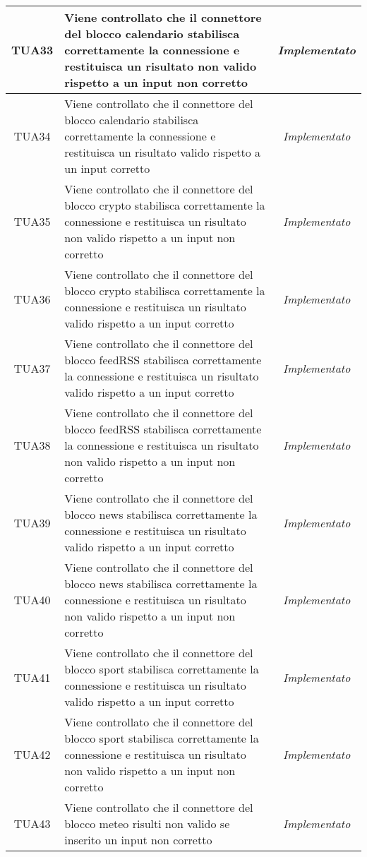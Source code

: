 \begin{longtable}{|c|m{12em}|c|}
TUA33 & Viene controllato che il connettore del blocco calendario stabilisca correttamente la connessione e restituisca un risultato non valido rispetto a un input non corretto& \textit{Implementato}\\ \hline
TUA34 & Viene controllato che il connettore del blocco calendario stabilisca correttamente la connessione e restituisca un risultato valido rispetto a un input corretto& \textit{Implementato}\\ \hline
TUA35 & Viene controllato che il connettore del blocco crypto stabilisca correttamente la connessione e restituisca un risultato non valido rispetto a un input non corretto& \textit{Implementato}\\ \hline
TUA36 & Viene controllato che il connettore del blocco crypto stabilisca correttamente la connessione e restituisca un risultato valido rispetto a un input corretto& \textit{Implementato}\\ \hline
TUA37 & Viene controllato che il connettore del blocco feedRSS stabilisca correttamente la connessione e restituisca un risultato valido rispetto a un input corretto& \textit{Implementato}\\ \hline
TUA38 & Viene controllato che il connettore del blocco feedRSS stabilisca correttamente la connessione e restituisca un risultato non valido rispetto a un input non corretto& \textit{Implementato}\\ \hline
TUA39 & Viene controllato che il connettore del blocco news stabilisca correttamente la connessione e restituisca un risultato valido rispetto a un input corretto& \textit{Implementato}\\ \hline
TUA40 & Viene controllato che il connettore del blocco news stabilisca correttamente la connessione e restituisca un risultato non valido rispetto a un input non corretto& \textit{Implementato}\\ \hline
TUA41 & Viene controllato che il connettore del blocco sport stabilisca correttamente la connessione e restituisca un risultato valido rispetto a un input corretto& \textit{Implementato}\\ \hline
TUA42 &  Viene controllato che il connettore del blocco sport stabilisca correttamente la connessione e restituisca un risultato non valido rispetto a un input non corretto& \textit{Implementato}\\ \hline
TUA43 & Viene controllato che il connettore del blocco meteo risulti non valido se inserito un input non corretto& \textit{Implementato}\\ \hline

\end{longtable}

